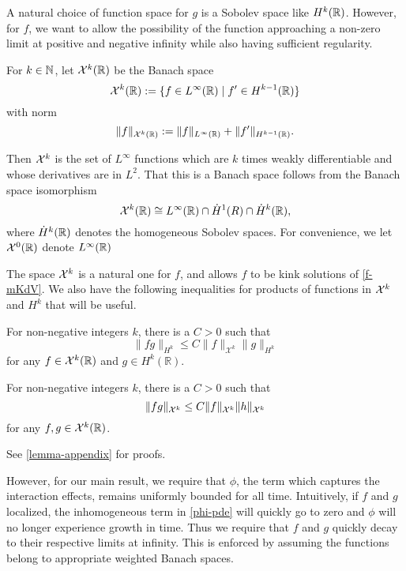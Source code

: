 A natural choice of function space for \(g\) is a Sobolev space like \(H^k(\mathbb{R})\). However, for \(f\), we want to allow the possibility of the function approaching a non-zero limit at positive and negative infinity while also having sufficient regularity. 
\begin{defn}
	For \(k\in\mathbb{N}\), let \(\mathcal{X}^k(\mathbb{R})\) be the Banach space 
	\begin{equation}
		\mathcal{X}^k(\mathbb{R}) := \{f \in L^\infty(\mathbb{R}) \mid f'\in H^{k-1}(\mathbb{R})\}
	\end{equation}
	with norm
	\begin{equation}
		\| f \|_{\mathcal{X}^k(\mathbb{R})} := \| f \|_{L^\infty(\mathbb{R})} + \| f' \|_{H^{k-1}(\mathbb{R})}.
	\end{equation}
\end{defn}
Then \(\mathcal{X}^k\) is the set of \(L^\infty\) functions which are \(k\) times weakly differentiable and whose derivatives are in \(L^2\). That this is a Banach space follows from the Banach space isomorphism
\begin{equation}
	\mathcal{X}^k(\mathbb{R}) \cong L^\infty(\mathbb{R}) \cap \dot H^1(R) \cap \dot H^k(\mathbb{R}),
\end{equation}
where \(\dot H^k(\mathbb{R})\) denotes the homogeneous Sobolev spaces. For convenience, we let \(\mathcal{X}^0(\mathbb{R})\) denote \(L^\infty(\mathbb{R})\)

The space \(\mathcal{X}^k\) is a natural one for \(f\), and allows \(f\) to be kink solutions of \cref{f-mKdV}. We also have the following inequalities for products of functions in \(\mathcal{X}^k\) and \(H^k\) that will be useful. 

	
\begin{lem}
	For non-negative integers \(k\), there is a \(C>0\) such that
	\begin{equation}\label{prod_rule}
		\| fg \|_{H^k} \leq C \| f \|_{\mathcal X^k} \| g \|_{H^k}
	\end{equation}
	for any \(f\in \mathcal{X}^k(\mathbb R)\) and \(g \in H^k(\mathbb R)\).
\end{lem}

\begin{lem}
	For non-negative integers \(k\), there is a \(C>0\) such that
	\begin{equation}
		\| fg \|_{\mathcal{X}^k} \leq C \| f \|_{\mathcal{X}^k} \| h \|_{\mathcal{X}^k}
	\end{equation}
	for any \(f,g\in \mathcal{X}^k(\mathbb R)\).
\end{lem}
See \cref{lemma-appendix} for proofs.

However, for our main result, we require that \(\phi\), the term which captures the interaction effects, remains uniformly bounded for all time. Intuitively, if \(f\) and \(g\) localized, the inhomogeneous term in \cref{phi-pde} will quickly go to zero and \(\phi\) will no longer experience growth in time. Thus we require that \(f\) and \(g\) quickly decay to their respective limits at infinity. This is enforced by assuming the functions belong to appropriate weighted Banach spaces.

